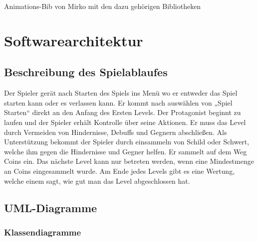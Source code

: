 \documentclass{article}
\begin{document}
Animations-Bib von Mirko mit den dazu gehörigen Bibliotheken  



\newpage

\section{Softwarearchitektur}

\vspace{1cm}

\subsection{Beschreibung des Spielablaufes}


Der Spieler gerät nach Starten des Spiels ins Menü wo er entweder das Spiel starten kann oder es
verlassen kann. Er kommt nach auswählen von „Spiel Starten“ direkt an den Anfang des Ersten
Levels. Der Protagonist beginnt zu laufen und der Spieler erhält Kontrolle über seine Aktionen. Er
muss das Level durch Vermeiden von Hindernisse, Debuffs und Gegnern abschließen. Als
Unterstützung bekommt der Spieler durch einsammeln von Schild oder Schwert,
welche ihm gegen die Hindernisse und Gegner helfen. Er sammelt auf dem Weg Coins ein. Das nächste Level kann nur betreten werden, wenn eine Mindestmenge an Coins eingesammelt wurde. Am Ende jedes Levels gibt es eine Wertung, welche einem sagt, wie gut man das Level abgeschlossen hat.\newline

\subsection{UML-Diagramme}

\vspace{1cm}

\subsubsection{Klassendiagramme}

\end{document}
